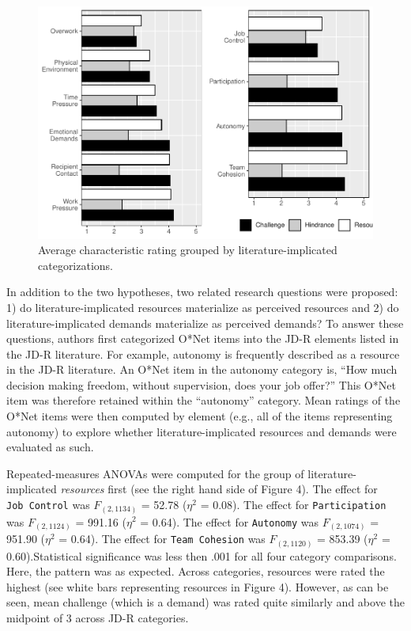 \documentclass[
  english,
  man]{apa6}
\begin{document}
\begin{figure}
\centering
\includegraphics{Submission_files/figure-latex/scalelevelgraphs-1.pdf}
\caption{\label{fig:scalelevelgraphs}Average characteristic rating grouped by literature-implicated categorizations.}
\end{figure}

In addition to the two hypotheses, two related research questions were proposed: 1) do literature-implicated resources materialize as perceived resources and 2) do literature-implicated demands materialize as perceived demands? To answer these questions, authors first categorized O*Net items into the JD-R elements listed in the JD-R literature. For example, autonomy is frequently described as a resource in the JD-R literature. An O*Net item in the autonomy category is, ``How much decision making freedom, without supervision, does your job offer?'' This O*Net item was therefore retained within the ``autonomy'' category. Mean ratings of the O*Net items were then computed by element (e.g., all of the items representing autonomy) to explore whether literature-implicated resources and demands were evaluated as such.

Repeated-measures ANOVAs were computed for the group of literature-implicated \emph{resources} first (see the right hand side of Figure 4). The effect for \texttt{Job\ Control} was \(F_{(2, 1134)}\) = 52.78 (\(\eta^2\) = 0.08).
The effect for \texttt{Participation} was \(F_{(2, 1124)}\) = 991.16 (\(\eta^2\) = 0.64).
The effect for \texttt{Autonomy} was \(F_{(2, 1074)}\) = 951.90 (\(\eta^2\) = 0.64).
The effect for \texttt{Team\ Cohesion} was \(F_{(2, 1120)}\) = 853.39 (\(\eta^2\) = 0.60).Statistical significance was less then .001 for all four category comparisons. Here, the pattern was as expected. Across categories, resources were rated the highest (see white bars representing resources in Figure 4). However, as can be seen, mean challenge (which is a demand) was rated quite similarly and above the midpoint of 3 across JD-R categories.
\end{document}

